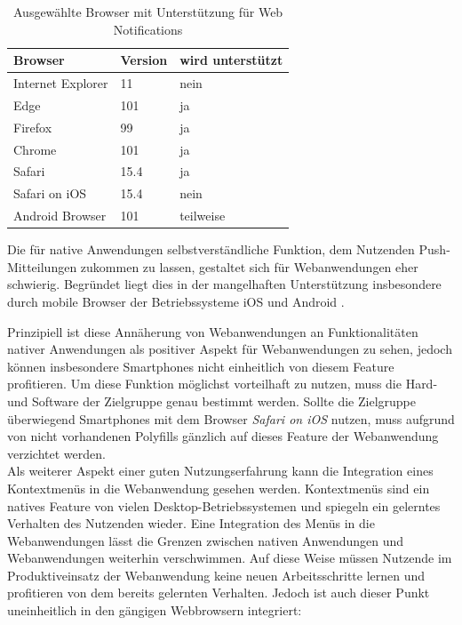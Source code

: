 \documentclass[a4paper]{scrartcl}
\begin{document}
\begin{table}[H]
 	\centering
 	\caption{Ausgewählte Browser mit Unterstützung für Web Notifications}
 	\begin{center}
 		\begin{tabularx}{\linewidth}{| Y | Y | Y |}
 			\hline
 			\textbf{Browser} & \textbf{Version} & \textbf{wird unterstützt} \\
 			\hline \hline
 			Internet Explorer & 11 & nein \\
 			\hline
 			Edge & 101 & ja \\
 			\hline
 			Firefox & 99 & ja \\
 			\hline
 			Chrome & 101 & ja \\
 			\hline
 			Safari & 15.4 & ja \\
 			\hline
 			Safari on iOS & 15.4 & nein \\
 			\hline
 			Android Browser & 101 & teilweise \\
 			\hline
 		\end{tabularx}
 	\end{center}
 	Die für native Anwendungen selbstverständliche Funktion, dem Nutzenden Push-Mitteilungen zukommen zu lassen, gestaltet sich für Webanwendungen eher schwierig. Begründet liegt dies in der mangelhaften Unterstützung insbesondere durch mobile Browser der Betriebssysteme iOS und Android \autocite{Web_Notifications}. 
 \end{table}

Prinzipiell ist diese Annäherung von Webanwendungen an Funktionalitäten nativer Anwendungen als positiver Aspekt für Webanwendungen zu sehen, jedoch können insbesondere Smartphones nicht einheitlich von diesem Feature profitieren. Um diese Funktion möglichst vorteilhaft zu nutzen, muss die Hard- und Software der Zielgruppe genau bestimmt werden. Sollte die Zielgruppe überwiegend Smartphones mit dem Browser \textit{Safari on iOS} nutzen, muss aufgrund von nicht vorhandenen Polyfills gänzlich auf dieses Feature der Webanwendung verzichtet werden. \\

Als weiterer Aspekt einer guten Nutzungserfahrung kann die Integration eines Kontextmenüs in die Webanwendung gesehen werden. Kontextmenüs sind ein natives Feature von vielen Desktop-Betriebssystemen und spiegeln ein gelerntes Verhalten des Nutzenden wieder. Eine Integration des Menüs in die Webanwendungen lässt die Grenzen zwischen nativen Anwendungen und Webanwendungen weiterhin verschwimmen. Auf diese Weise müssen Nutzende im Produktiveinsatz der Webanwendung keine neuen Arbeitsschritte lernen und profitieren von dem bereits gelernten Verhalten. Jedoch ist auch dieser Punkt uneinheitlich in den gängigen Webbrowsern integriert:
\end{document}
